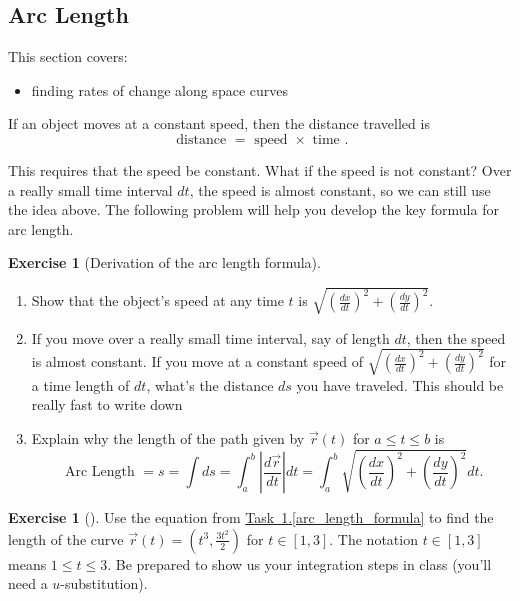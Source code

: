 \documentclass[10pt,]{book}
\theoremstyle{plain}
\theoremstyle{definition}
\theoremstyle{definition}
\theoremstyle{definition}
\theoremstyle{definition}
\newtheorem{exploration}[project]{Exercise}
\theoremstyle{definition}
\numberwithin{equation}{section}
\newcommand{\ds}{\displaystyle}
\begin{document}
\subsection[{Arc Length}]{Arc Length}\label{arc_length}
This section covers: \leavevmode%
\begin{itemize}[label=\textbullet]
\item{}finding rates of change along space curves%
\end{itemize}
%
\par
If an object moves at a constant speed, then the distance travelled is%
\begin{equation*}
\text{ distance }  = \text{ speed } \times\text{ time } .
\end{equation*}
%
\par
This requires that the speed be constant. What if the speed is not constant? Over a really small time interval \(dt\), the speed is almost constant, so we can still use the idea above. The following problem will help you develop the key formula for arc length.%
\begin{exploration}[Derivation of the arc length formula]\label{exploration-80}
\leavevmode%
\begin{enumerate}[font=\bfseries,label=(\alph*),ref=\alph*]
\item\label{task-132} Show that the object's speed at any time \(t\) is \(\ds\sqrt{\left(\frac{dx}{dt}\right)^2+\left(\frac{dy}{dt}\right)^2}\).%
\item\label{task-133} If you move over a really small time interval, say of length \(dt\), then the speed is almost constant. If you move at a constant speed of \(\ds\sqrt{\left(\frac{dx}{dt}\right)^2+\left(\frac{dy}{dt}\right)^2}\) for a time length of \(dt\), what's the distance \(ds\) you have traveled. This should be really fast to write down%
%
\item\label{arc_length_formula} Explain why the length of the path given by \(\vec r(t)\) for \(a\leq t\leq b\) is   %
\begin{equation*}
\text{ Arc Length } =s=\int ds=\int_a^b \left|\frac{d\vec r}{dt}\right| dt=\int_a^b \sqrt{\left(\frac{dx}{dt}\right)^2+\left(\frac{dy}{dt}\right)^2}dt.
\end{equation*}
%
\end{enumerate}
\end{exploration}
\begin{exploration}[]\label{exploration-81}
Use the equation from \hyperref[arc_length_formula]{Task~\ref{exploration-80}.\ref{arc_length_formula}} to find the length of the curve \(\ds \vec r(t) = \left(t^3,\frac{3t^2}{2}\right)\) for \(t\in[1,3]\). The notation \(t\in[1,3]\) means \(1\leq t\leq 3\). Be prepared to show us your integration steps in class (you'll need a \(u\)-substitution).%
\end{exploration}
\end{document}
